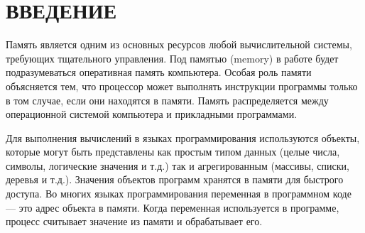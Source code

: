 \part*{ВВЕДЕНИЕ}

%
%
%
%
%



Память является одним из основных ресурсов любой вычислительной системы, требующих тщательного управления. Под памятью (memory) в работе будет подразумеваться оперативная память компьютера. Особая роль памяти объясняется тем, что процессор может выполнять инструкции программы только в том случае, если они находятся в памяти. Память распределяется между операционной системой компьютера и прикладными программами. \cite{tannenbaum}

Для выполнения вычислений в языках программирования используются объекты, которые могут быть представлены как простым типом данных (целые числа, символы, логические значения и т.д.) так и агрегированным (массивы, списки, деревья и т.д.). Значения объектов программ хранятся в памяти для быстрого доступа. Во многих языках программирования переменная в программном коде --- это адрес объекта в памяти. \cite{c} \cite{cpp} \cite{golang} Когда переменная используется в программе, процесс считывает значение из памяти и обрабатывает его.

